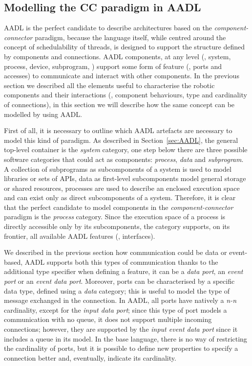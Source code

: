 \subsection{Modelling the CC paradigm in AADL}
\label{sec:aadl-cnc}
AADL is the perfect candidate to describe architectures based on the \textit{component-connector} paradigm, because the language itself, while centred around the concept of schedulability of threads, is designed to support the structure defined by components and connections. AADL components, at any level (\eg, system, process, device, subprogram, \etc) support some form of feature (\ie, ports and accesses) to communicate and interact with other components. In the previous section we described all the elements useful to characterise the robotic components and their interactions (\ie, component behaviours, type and cardinality of connections), in this section we will describe how the same concept can be modelled by using AADL.

First of all, it is necessary to outline which AADL artefacts are necessary to model this kind of paradigm. As described in Section~\ref{sec:AADL}, the general top-level container is the \textit{system} category, one step below there are three possible software categories that could act as components: \textit{process}, \textit{data} and \textit{subprogram}. A collection of subprograms as subcomponents of a system is used to model libraries or sets of APIs, data as first-level subcomponents model general storage or shared resources, processes are used to describe an enclosed execution space and can exist only as direct subcomponents of a system. Therefore, it is clear that the perfect candidate to model components in the \textit{component-connector} paradigm is the \textit{process} category. Since the execution space of a process is directly accessible only by its subcomponents, the category supports, on its frontier, all available AADL features (\ie, interfaces). 

We described in the previous section how communication could be data or event-based, AADL supports both this types of communication thanks to the additional type specifier when defining a feature, it can be a \textit{data port}, an \textit{event port} or an \textit{event data port}. Moreover, ports can be characterised by a specific data type, defined using a \textit{data} category; this is useful to model the type of message exchanged in the connection. In AADL, all ports have natively a \textit{n-n} cardinality, except for the \textit{input data port}; since this type of port models a communication with no queue, it does not support multiple incoming connections; however, they are supported by the \textit{input event data port} since it includes a queue in its model. In the base language, there is no way of restricting the cardinality of ports, but it is possible to define new properties to specify a connection better and, eventually, indicate its cardinality.

